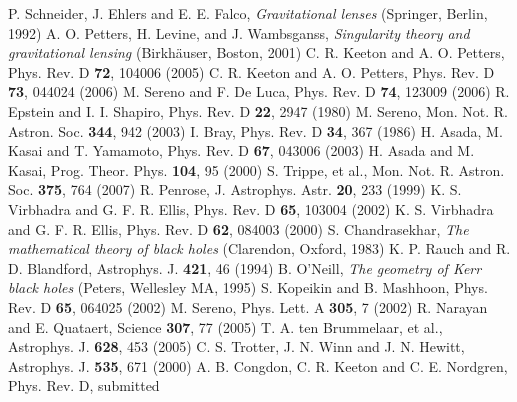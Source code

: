 \documentclass[prd,12pt,a4paper,showpacs]{revtex4}
\begin{document}
\begin{thebibliography}{99}

 P. Schneider,  J. Ehlers and E. E. Falco, \textit{Gravitational lenses} (Springer, Berlin, 1992)
 A. O. Petters, H. Levine, and J. Wambsganss, \textit{Singularity theory and gravitational lensing} (Birkh\"{a}user, Boston, 2001)
 C. R. Keeton and A. O. Petters, Phys. Rev. D \textbf{72}, 104006 (2005)
 C. R. Keeton and A. O. Petters, Phys. Rev. D \textbf{73}, 044024 (2006)
 M. Sereno and F. De Luca, Phys. Rev. D \textbf{74}, 123009 (2006)
 R. Epstein and I. I. Shapiro, Phys. Rev. D \textbf{22}, 2947 (1980)
 M. Sereno, Mon. Not. R. Astron. Soc. \textbf{344}, 942 (2003)
 I. Bray, Phys. Rev. D \textbf{34}, 367 (1986)
 H. Asada, M. Kasai and T. Yamamoto, Phys. Rev. D \textbf{67}, 043006 (2003)
 H. Asada and M. Kasai, Prog. Theor. Phys. \textbf{104}, 95 (2000)
 S. Trippe, et al., Mon. Not. R. Astron. Soc. \textbf{375}, 764 (2007)
 R. Penrose, J. Astrophys. Astr. \textbf{20}, 233 (1999)
 K. S. Virbhadra and G. F. R. Ellis, Phys. Rev. D \textbf{65}, 103004 (2002)
 K. S. Virbhadra and G. F. R. Ellis, Phys. Rev. D \textbf{62}, 084003 (2000)
 S. Chandrasekhar, \textit{The mathematical theory of black holes} (Clarendon, Oxford, 1983)
 K. P. Rauch and R. D. Blandford, Astrophys. J. \textbf{421}, 46 (1994)
 B. O'Neill, \textit{The geometry of Kerr black holes} (Peters, Wellesley MA, 1995)
 S. Kopeikin and B. Mashhoon, Phys. Rev. D \textbf{65}, 064025 (2002)
 M. Sereno, Phys. Lett. A \textbf{305}, 7 (2002)
 R. Narayan and E. Quataert, Science \textbf{307}, 77 (2005)
 T. A. ten Brummelaar, et al., Astrophys. J. {\bf 628}, 453 (2005)
 C. S. Trotter, J. N. Winn and J. N. Hewitt, Astrophys. J. \textbf{535}, 671 (2000) 
 A. B. Congdon, C. R. Keeton and C. E. Nordgren, Phys. Rev. D, submitted

\end{thebibliography}
\end{document}
